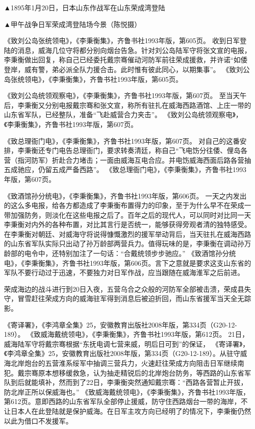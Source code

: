 \documentclass[12pt,UTF8]{ctexbook}
\begin{document}
▲1895年1月20日，日本山东作战军在山东荣成湾登陆


▲甲午战争日军荣成湾登陆场今景（陈悦摄）

《致刘公岛张统领电》，《李秉衡集》，齐鲁书社1993年版，第605页。
收到日军登陆的消息，威海几位守将都分别向烟台告急。针对刘公岛陆军守将张文宣的电报，李秉衡做出回复，称自己已经委托戴宗骞催动河防军前往荣成援救，并许诺“如倭登岸，威有警，弟必派全队力援合击。此时惟有彼此同心，以期集事”。 《致刘公岛张统领电》，《李秉衡集》，齐鲁书社1993年版，第605页。

《致刘公岛统领观察电》，《李秉衡集》，齐鲁书社1993年版，第607页。
至当天午后，李秉衡又分别电报戴宗骞和张文宣，称所有驻扎在威海西路酒馆、上庄一带的山东省军队，已经整队，准备“飞赴威营合力夹击”。 《致刘公岛统领观察电》，《李秉衡集》，齐鲁书社1993年版，第607页。

《致总理衙门电》，《李秉衡集》，齐鲁书社1993年版，第607页。
对自己的这番安排，李秉衡还专门电告总理衙门，要求转奏清廷，称自己“飞电饬分往倭、俚岛各营（指河防军）折赴合力堵击；一面由威海互电合应。并电饬威海西面后路各营抽五成驰应，仍留五成严备西路”。 《致总理衙门电》，《李秉衡集》，齐鲁书社1993年版，第607页。

《致酒馆孙分统电》，《李秉衡集》，齐鲁书社1993年版，第606页。
一天之内发出的这么多电报，给各方都造成了李秉衡布置得力的印象，至于为什么早不在荣成一带加强防务，则淡化在这些电报之后了。百年之后的现代人，可以同时对比同一天李秉衡对内外的各种布置，对比其言行是否统一，能够获得旁观者清的独特感受。在李秉衡对朝廷、对威海守将说得慷慨激烈的援军举动背后，当天驻扎在威海西路的山东省军队实际只出动了孙万龄部两营兵力。值得玩味的是，李秉衡在调动孙万龄部的电令中，还特别加注了一句话：“合戴统领步步驰应。” 《致酒馆孙分统电》，《李秉衡集》，齐鲁书社1993年版，第606页。言下之意就是要求这支山东省的军队不要行动过于迅速，不要独力对日军作战，应当跟随在威海淮军之后前进。

荣成海边的战斗进行到20日入夜，五营乌合之众般的河防军全部被击溃，荣成县失守，冒雪赶往荣成方向的威海驻军得到消息后被迫折回，而山东省援军当天全无踪影。

《寄译署》，《李鸿章全集》25，安徽教育出版社2008年版，第334页（G20-12-189）。
《致威海戴统领电》，《李秉衡集》，齐鲁书社1993年版，第612页。
21日，威海陆军守将戴宗骞根据“东抚电调七营来威，明后日可到”的保证， 《寄译署》，《李鸿章全集》25，安徽教育出版社2008年版，第334页（G20-12-189）。从驻守威海北岸炮台的五营淮系绥军中抽调三营兵力，火速赶往荣成方向阻击日军继续南犯。戴宗骞原本想移缓救急，认为抽走精锐后的北岸炮台防务，等西路的山东省军队到后就能填补，然而到了22日，李秉衡突然通知戴宗骞：“西路各营暂止开拔，防北岸正所以保威海也。” 《致威海戴统领电》，《李秉衡集》，齐鲁书社1993年版，第612页。意即西路的山东省军队全部停止援威，防守住西路烟台一带的海岸，不让日本人在此登陆就是保护威海。在日军主攻方向已经明了的情况下，李秉衡仍然以此为借口不发援军。
\end{document}

